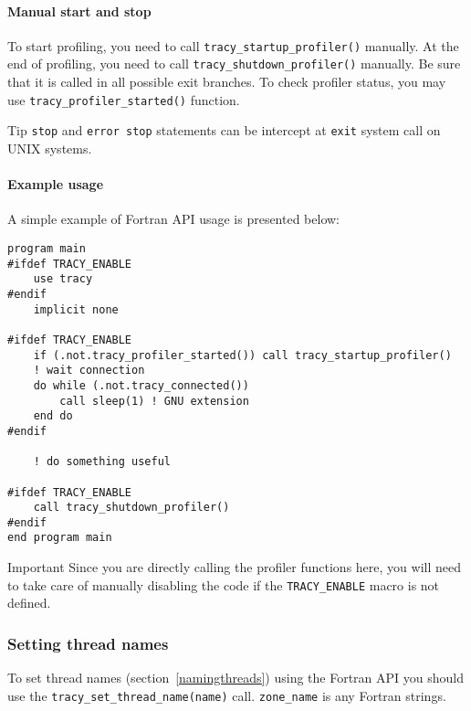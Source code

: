 \documentclass[hidelinks,titlepage,a4paper,twoside]{article}
\begin{document}
\paragraph{Manual start and stop}

To start profiling, you need to call \texttt{tracy\_startup\_profiler()} manually.
At the end of profiling, you need to call \texttt{tracy\_shutdown\_profiler()} manually.
Be sure that it is called in all possible exit branches.
To check profiler status, you may use \texttt{tracy\_profiler\_started()} function.

\begin{bclogo}[
noborder=true,
couleur=black!5,
logo=\bcbombe
]{Tip}
\texttt{stop} and \texttt{error stop} statements can be intercept at \texttt{exit} system call on UNIX systems.
\end{bclogo}

\paragraph{Example usage}

A simple example of Fortran API usage is presented below:

\begin{lstlisting}
program main
#ifdef TRACY_ENABLE
    use tracy
#endif
    implicit none

#ifdef TRACY_ENABLE
    if (.not.tracy_profiler_started()) call tracy_startup_profiler()
    ! wait connection
    do while (.not.tracy_connected())
        call sleep(1) ! GNU extension
    end do
#endif

    ! do something useful

#ifdef TRACY_ENABLE
    call tracy_shutdown_profiler()
#endif
end program main
\end{lstlisting}

\begin{bclogo}[
noborder=true,
couleur=black!5,
logo=\bcbombe
]{Important}
Since you are directly calling the profiler functions here, you will need to take care of manually disabling the code if the \texttt{TRACY\_ENABLE} macro is not defined.
\end{bclogo}

\subsubsection{Setting thread names}

To set thread names (section~\ref{namingthreads}) using the Fortran API you should use the \texttt{tracy\_set\_thread\_name(name)} call.
\texttt{zone\_name} is any Fortran strings.
\end{document}
